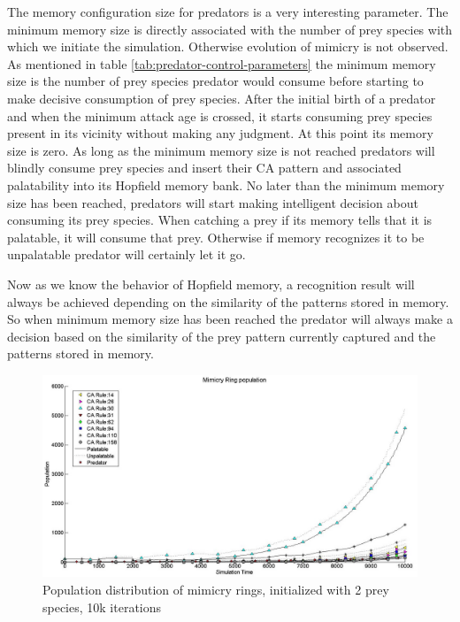 \documentclass[letterpaper]{article}
\numberwithin{equation}{section}
\begin{document}
The memory configuration size for predators is a very interesting parameter. The minimum memory size is directly associated with the number of prey species with which we initiate the simulation. Otherwise evolution of mimicry is not observed. As mentioned in table \ref{tab:predator-control-parameters} the minimum memory size is the number of prey species predator would consume before starting to make decisive consumption of prey species. After the initial birth of a predator and when the minimum attack age is crossed, it starts consuming prey species present in its vicinity without making any judgment. At this point its memory size is zero. As long as the minimum memory size is not reached predators will blindly consume prey species and insert their CA pattern and associated palatability into its Hopfield memory bank. No later than the minimum memory size has been reached, predators will start making intelligent decision about consuming its prey species. When catching a prey if its memory tells that it is palatable, it will consume that prey. Otherwise if memory recognizes it to be unpalatable predator will certainly let it go.

Now as we know the behavior of Hopfield memory, a recognition result will always be achieved depending on the similarity of the patterns stored in memory. So when minimum memory size has been reached the predator will always make a decision based on the similarity of the prey pattern currently captured and the patterns stored in memory.

\begin{figure}[H]
	\centering
	\includegraphics[scale=0.40]{../tex/images/simTime10k-2Prey}
	\caption[Population distribution of mimicry rings (2 prey species, 10k iterations)]{Population distribution of mimicry rings, initialized with 2 prey species, 10k iterations}
	\label{fig:plot-2-prey}
\end{figure}
\end{document}
